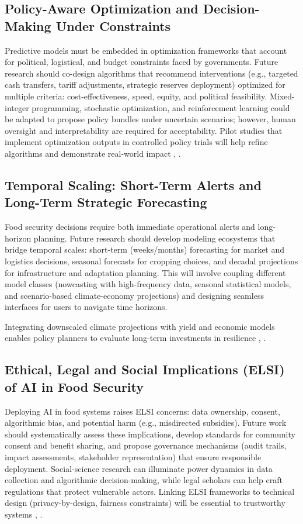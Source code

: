 \documentclass[preprint,12pt]{elsarticle}
\begin{document}
	\subsection{Policy-Aware Optimization and Decision-Making Under Constraints}
	
	Predictive models must be embedded in optimization frameworks that
	account for political, logistical, and budget constraints faced by
	governments. Future research should co-design algorithms that recommend
	interventions (e.g., targeted cash transfers, tariff adjustments,
	strategic reserves deployment) optimized for multiple criteria:
	cost-effectiveness, speed, equity, and political feasibility.
	Mixed-integer programming, stochastic optimization, and reinforcement
	learning could be adapted to propose policy bundles under uncertain
	scenarios; however, human oversight and interpretability are required
	for acceptability. Pilot studies that implement optimization outputs in
	controlled policy trials will help refine algorithms and demonstrate
	real-world impact \cite{ref83}, \cite{ref67}.
	
	\subsection{Temporal Scaling: Short-Term Alerts and Long-Term Strategic Forecasting}
	
	Food security decisions require both immediate operational alerts and
	long-horizon planning. Future research should develop modeling
	ecosystems that bridge temporal scales: short-term (weeks/months)
	forecasting for market and logistics decisions, seasonal forecasts for
	cropping choices, and decadal projections for infrastructure and
	adaptation planning. This will involve coupling different model classes
	(nowcasting with high-frequency data, seasonal statistical models, and
	scenario-based climate-economy projections) and designing seamless
	interfaces for users to navigate time horizons.
	
	Integrating downscaled climate projections with yield and economic
	models enables policy planners to evaluate long-term investments in
	resilience \cite{ref81}, \cite{ref82}.
	
	\subsection{Ethical, Legal and Social Implications (ELSI) of AI in Food Security}
	
	Deploying AI in food systems raises ELSI concerns: data ownership,
	consent, algorithmic bias, and potential harm (e.g., misdirected
	subsidies). Future work should systematically assess these implications,
	develop standards for community consent and benefit sharing, and propose
	governance mechanisms (audit trails, impact assessments, stakeholder
	representation) that ensure responsible deployment. Social-science
	research can illuminate power dynamics in data collection and
	algorithmic decision-making, while legal scholars can help craft
	regulations that protect vulnerable actors. Linking ELSI frameworks to
	technical design (privacy-by-design, fairness constraints) will be
	essential to trustworthy systems \cite{ref78}, \cite{ref80}.
	
\end{document}
